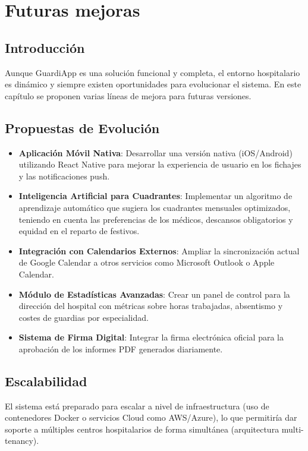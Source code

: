 \chapter{Futuras mejoras} \label{cap:futuras_mejoras}

\section{Introducción}
Aunque GuardiApp es una solución funcional y completa, el entorno hospitalario es dinámico y siempre existen oportunidades para evolucionar el sistema. En este capítulo se proponen varias líneas de mejora para futuras versiones.

\section{Propuestas de Evolución}

\begin{itemize}
    \item \textbf{Aplicación Móvil Nativa}: Desarrollar una versión nativa (iOS/Android) utilizando React Native para mejorar la experiencia de usuario en los fichajes y las notificaciones push.
    \item \textbf{Inteligencia Artificial para Cuadrantes}: Implementar un algoritmo de aprendizaje automático que sugiera los cuadrantes mensuales optimizados, teniendo en cuenta las preferencias de los médicos, descansos obligatorios y equidad en el reparto de festivos.
    \item \textbf{Integración con Calendarios Externos}: Ampliar la sincronización actual de Google Calendar a otros servicios como Microsoft Outlook o Apple Calendar.
    \item \textbf{Módulo de Estadísticas Avanzadas}: Crear un panel de control para la dirección del hospital con métricas sobre horas trabajadas, absentismo y costes de guardias por especialidad.
    \item \textbf{Sistema de Firma Digital}: Integrar la firma electrónica oficial para la aprobación de los informes PDF generados diariamente.
\end{itemize}

\section{Escalabilidad}
El sistema está preparado para escalar a nivel de infraestructura (uso de contenedores Docker o servicios Cloud como AWS/Azure), lo que permitiría dar soporte a múltiples centros hospitalarios de forma simultánea (arquitectura multi-tenancy).

